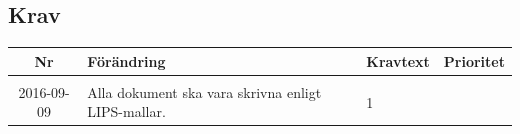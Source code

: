 \documentclass[a4paper,titlepage,12pt]{article}
\newcounter{reqNr}
\newcounter{reqNrII}
\newcommand{\nextReqNrII}{\stepcounter{reqNrII}\arabic{reqNrII}}
\newcommand{\newRequirement}[1] {\pbox{5cm}{Tillagt \\#1}}
\begin{document}
	\subsection{Krav}
	\begin{longtable}[c]{ c l>{\raggedright}p{} l }
		\textbf{Nr} & \textbf{Förändring} & \textbf{Kravtext} & \textbf{Prioritet} 
			\\ \midrule

		\nextReqNrII & \newRequirement{2016-09-09} & Alla dokument ska vara skrivna
		enligt LIPS-mallar. & 1
			\\ 

	\end{longtable}
\end{document}
